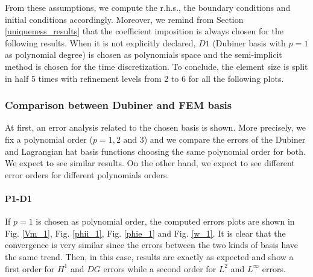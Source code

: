 \documentclass[a4paper,11pt]{article}
\begin{document}
\noindent From these assumptions, we compute the r.h.s., the boundary conditions and initial conditions accordingly. Moreover, we remind from Section \ref{uniqueness_results} that the coefficient imposition is always chosen for the following results. When it is not explicitly declared, $D1$ (Dubiner basis with $p=1$ as polynomial degree) is chosen as polynomials space and the semi-implicit method is chosen for the time discretization. To conclude, the element size is split in half 5 times with refinement levels from 2 to 6 for all the following plots.

\subsubsection{Comparison between Dubiner and FEM basis}
At first, an error analysis related to the chosen basis is shown. More precisely, we fix a polynomial order ($p=1,2 \text{ and } 3$) and we compare the errors of the Dubiner and Lagrangian hat basis functions choosing the same polynomial order for both. We expect to see similar results. On the other hand, we expect to see different error orders for different polynomials orders.
\paragraph{P1-D1}
If $p=1$ is chosen as polynomial order, the computed errors plots are shown in Fig. \ref{Vm_1}, Fig. \ref{phii_1}, Fig. \ref{phie_1} and Fig. \ref{w_1}. 
\noindent It is clear that the convergence is very similar since the errors between the two kinds of basis have the same trend. Then, in this case, results are exactly as expected and show a first order for $H^1$ and $DG$ errors while a second order for $L^2$ and $L^\infty$ errors.
\end{document}
